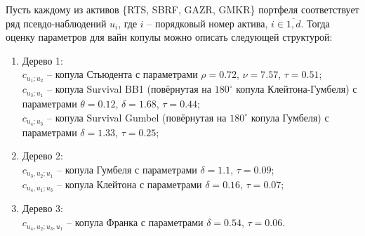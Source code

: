 Пусть каждому из активов \{RTS, SBRF, GAZR, GMKR\} портфеля соответствует ряд псевдо-наблюдений $u_i$, где $i$ -- порядковый номер актива, $i \in \overline{1,d}$. 
Тогда оценку параметров для вайн копулы можно описать следующей структурой:
%
\begin{enumerate}[label=(\roman*),leftmargin=1cm,labelwidth=1cm]
    \item Дерево 1:\\
    $c_{u_1;u_2}$ -- копула Стьюдента с параметрами $\rho=0.72$, $\nu=7.57$, $\tau=0.51$;\\
    $c_{u_3;u_1}$ -- копула Survival BB1 (повёрнутая на $180^{\circ}$ копула Клейтона-Гумбеля) с параметрами $\theta=0.12$, $\delta=1.68$, $\tau=0.44$;\\
    $c_{u_4;u_3}$ -- копула Survival Gumbel (повёрнутая на $180^{\circ}$ копула Гумбеля) с параметрами $\delta=1.33$, $\tau=0.25$;
    \item Дерево 2:\\
    $c_{u_3,u_2;u_1}$ -- копула Гумбеля с параметрами $\delta=1.1$, $\tau=0.09$;\\
    $c_{u_4,u_1;u_3}$ -- копула Клейтона с параметрами $\delta=0.16$, $\tau=0.07$;
    \item Дерево 3:\\
    $c_{u_4,u_2;u_3,u_1}$ -- копула Франка с параметрами $\delta=0.54$, $\tau=0.06$.
\end{enumerate}

